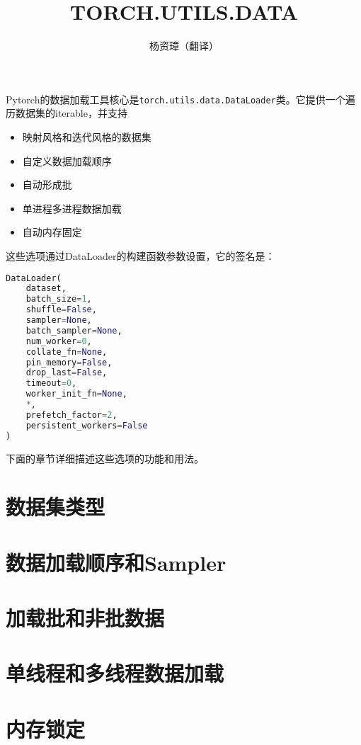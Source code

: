 \documentclass{ctexart}
\title{TORCH.UTILS.DATA}
\author{杨资璋（翻译）}
\begin{document}
\maketitle
Pytorch的数据加载工具核心是\lstinline{torch.utils.data.DataLoader}类。它提供一个遍历数据集的iterable，并支持
\begin{itemize}
    \item 映射风格和迭代风格的数据集
    \item 自定义数据加载顺序
    \item 自动形成批
    \item 单进程多进程数据加载
    \item 自动内存固定
\end{itemize}
这些选项通过DataLoader的构建函数参数设置，它的签名是：
\begin{lstlisting}[language=Python]
DataLoader(
    dataset, 
    batch_size=1, 
    shuffle=False, 
    sampler=None, 
    batch_sampler=None, 
    num_worker=0, 
    collate_fn=None,
    pin_memory=False, 
    drop_last=False, 
    timeout=0, 
    worker_init_fn=None,
    *, 
    prefetch_factor=2, 
    persistent_workers=False
)
\end{lstlisting}
下面的章节详细描述这些选项的功能和用法。
\section{数据集类型}

\section{数据加载顺序和Sampler}

\section{加载批和非批数据}

\section{单线程和多线程数据加载}

\section{内存锁定}

\end{document}
